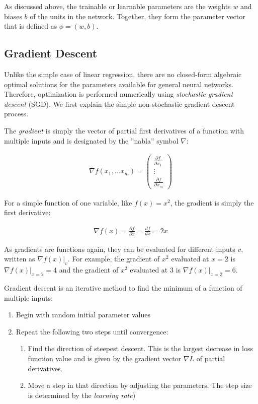 As discussed above, the trainable or learnable parameters are the weights $w$ and biases $b$ of the units in the network. Together, they form the parameter vector that is defined as $\phi = (w, b)$.

\subsection{Gradient Descent}

Unlike the simple case of linear regression, there are no closed-form algebraic optimal solutions for the parameters available for general neural networks. Therefore, optimization is performed numerically using \emph{stochastic gradient descent} (SGD). We first explain the simple non-stochastic gradient descent process. 

The \emph{gradient} is simply the vector of partial first derivatives of a function with multiple inputs and is designated by the ''nabla'' symbol $\nabla$:

\begin{align*}
\nabla f(x_1, \ldots x_m) = \begin{pmatrix} 
\frac{\partial f}{\partial x_1} \\
\vdots \\
\frac{\partial f}{\partial x_m} \end{pmatrix}
\end{align*}

For a simple function of one variable, like $f(x) = x^2$, the gradient is simply the first derivative:

\begin{align*}
\nabla f(x) = \frac{\partial f}{\partial x} = \frac{d f}{d x} = 2x 
\end{align*}

As gradients are functions again, they can be evaluated for different inputs $v$, written as $\nabla f(x) \rvert_{v}$. For example, the gradient of $x^2$ evaluated at $x=2$ is $\nabla f(x) \rvert_{x=2} = 4$ and the gradient of $x^2$ evaluated at $3$ is $\nabla f(x) \rvert_{x=3} = 6$.

\begin{samepage}
\noindent Gradient descent is an iterative method to find the minimum of a function of multiple inputs:
\begin{enumerate}
   \item Begin with random initial parameter values
   \item Repeat the following two steps until convergence:
   \begin{enumerate}
      \item Find the direction of steepest descent. This is the largest decrease in loss function value and is given by the gradient vector $\nabla L$ of partial derivatives.
      \item Move a step in that direction by adjusting the parameters. The step size is determined by the \emph{learning rate})
   \end{enumerate}
\end{enumerate}
\end{samepage}

